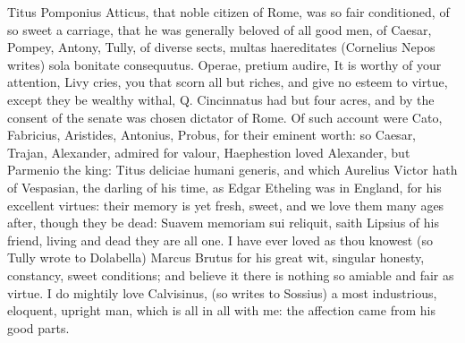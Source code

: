 {Titus Pomponius Atticus, that noble citizen of Rome, was so fair
conditioned, of so sweet a carriage, that he was generally beloved of
all good men, of Caesar, Pompey, Antony, Tully, of diverse sects, \etc{}
multas haereditates (Cornelius Nepos writes) sola bonitate
consequutus. Operae, pretium audire, \etc{} It is worthy of your
attention, Livy cries, you that scorn all but riches, and give no
esteem to virtue, except they be wealthy withal, Q. Cincinnatus had but
four acres, and by the consent of the senate was chosen dictator of
Rome. Of such account were Cato, Fabricius, Aristides, Antonius,
Probus, for their eminent worth: so Caesar, Trajan, Alexander, admired
for valour,  Haephestion loved Alexander, but Parmenio the king:
Titus deliciae humani generis, and which Aurelius Victor hath of
Vespasian, the darling of his time, as Edgar Etheling was in
England, for his excellent virtues: their memory is yet fresh,
sweet, and we love them many ages after, though they be dead: Suavem
memoriam sui reliquit, saith Lipsius of his friend, living and dead
they are all one. I have ever loved as thou knowest (so Tully
wrote to Dolabella) Marcus Brutus for his great wit, singular honesty,
constancy, sweet conditions; and believe it  there is nothing so
amiable and fair as virtue. I do mightily love Calvisinus, (so
\Pliny{} writes to Sossius) a most industrious, eloquent, upright man,
which is all in all with me: the affection came from his good parts.

}
